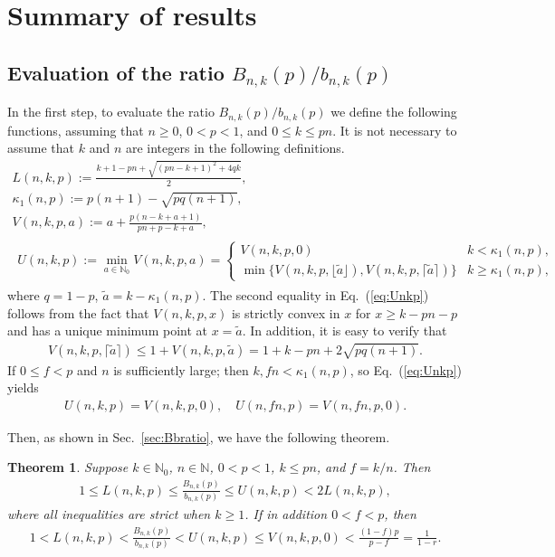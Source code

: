 \documentclass[aop]{imsart}
\theoremstyle{plain}
\newtheorem{theorem}{Theorem}[section]
\theoremstyle{remark}
\newcommand{\bbN}{\mathbb{N}}
\newcommand{\1}{\operatorname{\uppercase\expandafter{\romannumeral1}}}
\newcommand{\2}{\operatorname{\uppercase\expandafter{\romannumeral2}}}
\newcommand{\3}{\operatorname{\uppercase\expandafter{\romannumeral3}}}
\newcommand{\4}{\operatorname{\uppercase\expandafter{\romannumeral4}}}
\newcommand{\5}{\operatorname{\uppercase\expandafter{\romannumeral5}}}
\newcommand{\6}{\operatorname{\uppercase\expandafter{\romannumeral6}}}
\newcommand{\7}{\operatorname{\uppercase\expandafter{\romannumeral7}}}
\newcommand{\8}{\operatorname{\uppercase\expandafter{\romannumeral8}}}
\newcommand{\9}{\operatorname{\uppercase\expandafter{\romannumeral9}}}
\newcommand{\eref}[1]{Eq.~\textup{(\ref{#1})}}
\newcommand{\sref}[1]{Sec.~\ref{#1}}
\begin{document}
 

\section{Summary of results}\label{sec:summary}
\subsection{Evaluation of the ratio
$B_{n,k}(p)/b_{n,k}(p)$} In the first step, to evaluate the ratio $B_{n,k}(p)/b_{n,k}(p)$
 we define the following functions, assuming that $n\geq 0$,  $0<p<1$,  and $0\leq k\leq p n$. It is not necessary to assume that $k$ and $n$ are integers in the following definitions.
\begin{gather}
L(n,k,p):=\frac{k+1-p n+\sqrt{(p n-k+1)^2+4q k}}{2},\label{eq:Lnkp} \\
\kappa_1(n,p):=p(n+1)-\sqrt{p q(n+1)}, \label{eq:kappa1} \\
V(n,k,p,a):=a+\frac{p(n-k+a +1)}{p n+p-k+a},\label{eq:Vnkpa}\\
\begin{split}
U(n,k,p):=\min_{a\in \bbN_0} V(n,k,p,a)=\begin{cases}
V(n,k,p,0) &\! k< \kappa_1(n,p),\\
\min\bigl\{V(n,k,p,\lfloor \tilde{a} \rfloor), V(n,k,p,\lceil \tilde{a}\rceil)\bigr\}\!\! & k\geq \kappa_1(n,p),
\end{cases}\label{eq:Unkp}
\end{split}
\end{gather}
where $q=1-p$, $\tilde{a}= k-\kappa_1(n,p)$.
The second equality in \eref{eq:Unkp} follows from the fact that	$V(n,k,p,x)$ is strictly convex in $x$ for $x\geq k-p n-p$  and has a unique minimum point at $x=\tilde{a}$. In addition, it is easy to verify that 
\begin{align} 
V(n,k,p,\lceil \tilde{a}\rceil)\leq   1+V(n,k,p,\tilde{a} )=1+k-p n+2\sqrt{p q(n+1)}. 
\end{align}
If $0\leq f<p$ and $n$ is sufficiently large; then $k,f n<\kappa_1(n,p)$, so \eref{eq:Unkp} yields
\begin{align}
U(n,k,p)= V(n,k,p,0),\quad 
U(n,f n,p)=  V(n,f n,p,0). \label{eq:UnkpLargen}
\end{align} 




Then, as shown in \sref{sec:Bbratio}, we have the following theorem.
\begin{theorem}\label{thm:BnkbnkLBUB}
	Suppose  $k\in \bbN_0$, $n\in \bbN$, $0<p<1$,   $k\leq p n$, and $f=k/n$. Then 
	\begin{gather}
	1\leq L(n,k,p)\leq 	\frac{B_{n,k}(p)}{b_{n,k}(p)}\leq U(n,k,p)< 2L(n,k,p),\label{eq:BnkbnkLBUB}
\end{gather}	
where all inequalities are strict when $k\geq1$. If in addition	$0<f<p$, then
	\begin{gather}
	1<L(n,k,p)<\frac{B_{n,k}(p)}{b_{n,k}(p)}< U(n,k,p)\leq V(n,k,p,0)<  \frac{(1-f)p}{p-f}=\frac{1}{1-r}.	\label{eq:BnkbnkUBasymp}
	\end{gather}
\end{theorem}
\end{document}
